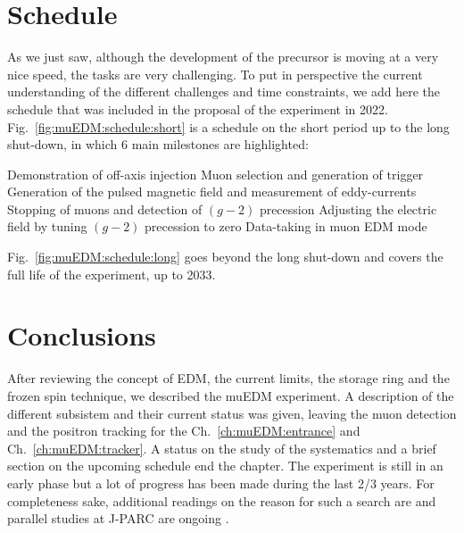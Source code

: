 \begin{refsection}
\section{Schedule}
    As we just saw, although the development of the precursor is moving at a very nice speed, the tasks are very challenging.
    To put in perspective the current understanding of the different challenges and time constraints, we add here the schedule that was included in the proposal of the experiment in 2022.
    Fig.~\ref{fig:muEDM:schedule:short} is a schedule on the short period up to the long shut-down, in which 6 main milestones are highlighted:
    \begin{outline}
        \1[1] Demonstration of off-axis injection
        \1[2] Muon selection and generation of trigger
        \1[3] Generation of the pulsed magnetic field and measurement of eddy-currents
        \1[4] Stopping of muons and detection of $(g - 2)$ precession
        \1[5] Adjusting the electric field by tuning $(g - 2)$ precession to zero
        \1[6] Data-taking in muon EDM mode
    \end{outline}
    Fig.~\ref{fig:muEDM:schedule:long} goes beyond the long shut-down and covers the full life of the experiment, up to 2033.

\section{Conclusions}
    After reviewing the concept of EDM, the current limits, the storage ring \cite{muEDM:Adelmann:2010} and the frozen spin technique, we described the muEDM experiment.
    A description of the different subsistem and their current status was given, leaving the muon detection and the positron tracking for the Ch.~\ref{ch:muEDM:entrance} and Ch.~\ref{ch:muEDM:tracker}.
    A status on the study of the systematics and a brief section on the upcoming schedule end the chapter.
    The experiment is still in an early phase but a lot of progress has been made during the last 2/3 years.
    For completeness sake, additional readings on the reason for such a search are \cite{muEDM:Semertzidis:2001}\cite{muEDM:Flavour:2008} and parallel studies at J-PARC are ongoing \cite{muEDM:J-PARC:2011} \cite{muEDM:J-PARC:2016}.



\end{refsection}

